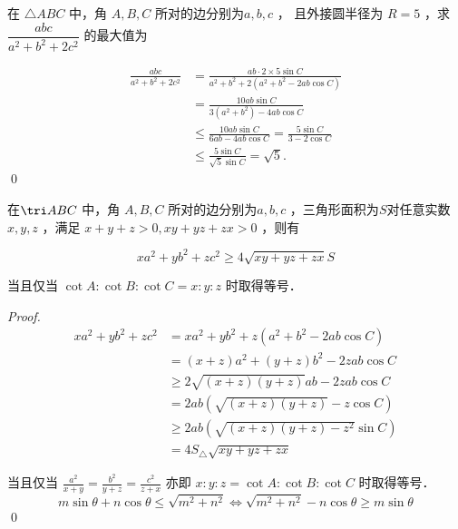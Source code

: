 \begin{example}
    在 $ \triangle A B C$  中，角 $ A, B, C$  所对的边分别为$  a, b, c $ ，
    且外接圆半径为 $ R=5 $ ，求$ \dfrac{a b c}{a^{2}+b^{2}+2 c^{2}} $ 的最大值为   
\end{example}

\begin{jie}
    \[
\begin{aligned}
    \frac{abc}{a^2 + b^2 + 2c^2} &= \frac{ab \cdot 2 \times 5 \sin C}{a^2 + b^2 + 2(a^2 + b^2 - 2ab \cos C)}\\
                                & = \frac{10ab \sin C}{3(a^2 + b^2) - 4ab \cos C}\\
                               &  \leq \frac{10ab \sin C}{6ab - 4ab \cos C} = \frac{5 \sin C}{3 - 2 \cos C} \\
                               &\leq \frac{5 \sin C}{\sqrt{5} \sin C} = \sqrt{5}.
\end{aligned}
\]
\qed
\end{jie}
\begin{theorem}[Weisenböck不等式]
    在\(\tri ABC\) 中，角 $ A, B, C$  所对的边分别为$  a, b, c $ ，三角形面积为\(S\)对任意实数 $ x, y, z $ ，满足 $ x+y+z>0,  x y+y z+z x>0$  ，则有

$$x a^{2}+y b^{2}+z c^{2} \geqslant 4 \sqrt{x y+y z+z x} S$$


当且仅当 $ \cot A: \cot B: \cot C=x: y: z$  时取得等号．
\end{theorem}
\begin{proof}
    \[\begin{aligned}
        x a^{2}+y b^{2}+z c^{2} & =x a^{2}+y b^{2}+z\left(a^{2}+b^{2}-2 a b \cos C\right) \\
        & =(x+z) a^{2}+(y+z) b^{2}-2 z a b \cos C \\
        & \geqslant 2 \sqrt{(x+z)(y+z)} a b-2 z a b \cos C \\
        & =2 a b(\sqrt{(x+z)(y+z)}-z \cos C) \\
        & \geqslant 2 a b\left(\sqrt{(x+z)(y+z)-z^{2}} \sin C\right) \\
        & =4 S_{\triangle} \sqrt{x y+y z+z x}
        \end{aligned}\]

        当且仅当 $ \frac{a^{2}}{x+y}=\frac{b^{2}}{y+z}=\frac{c^{2}}{z+x} $ 亦即 $ x: y: z=\cot A: \cot B: \cot C $ 时取得等号．
    \[m \sin \theta+n \cos \theta \leqslant \sqrt{m^{2}+n^{2}} \Longleftrightarrow \sqrt{m^{2}+n^{2}}-n \cos \theta \geqslant m \sin \theta\]
        \qed
\end{proof}
\clearpage
